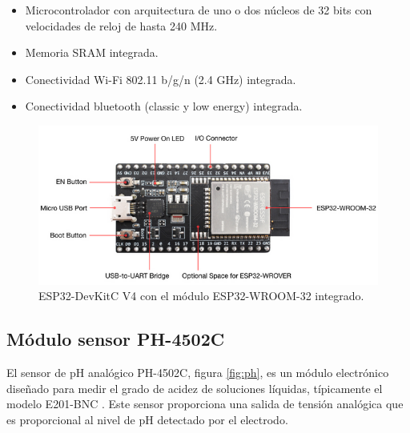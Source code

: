\begin{itemize}
	\item Microcontrolador con arquitectura de uno o dos núcleos de 32 bits con velocidades de reloj de hasta 240 MHz.
	\item Memoria SRAM integrada.
	\item Conectividad Wi-Fi 802.11 b/g/n (2.4 GHz) integrada.
	\item Conectividad bluetooth (classic y low energy) integrada.
\end{itemize}

\begin{figure}[h]
\centering
\includegraphics[scale=.5]{./Figures/devkit.png}
	\caption{ESP32-DevKitC V4 con el módulo ESP32-WROOM-32 integrado\protect\footnotemark.}
	\label{fig:devkit}
\end{figure}




\subsection{Módulo sensor PH-4502C}
El sensor de pH analógico PH-4502C, figura \ref{fig:ph}, es un módulo electrónico diseñado para medir el grado de acidez de soluciones líquidas, típicamente el modelo E201-BNC \cite{PH:4502C}. Este sensor proporciona una salida de tensión analógica que es proporcional al nivel de pH detectado por el electrodo.

